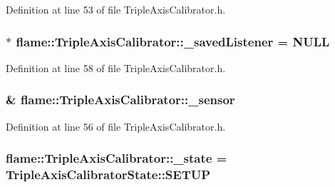 Definition at line 53 of file Triple\-Axis\-Calibrator.\-h.

\hypertarget{classflame_1_1_triple_axis_calibrator_ae80be2c28e5243d39b12c33f24ecb595}{
\subsubsection[{\-\_\-saved\-Listener}]{$\ast$ flame\-::\-Triple\-Axis\-Calibrator\-::\-\_\-saved\-Listener = N\-U\-L\-L\hspace{0.3cm}{\ttfamily [protected]}}}\label{classflame_1_1_triple_axis_calibrator_ae80be2c28e5243d39b12c33f24ecb595}


Definition at line 58 of file Triple\-Axis\-Calibrator.\-h.

\hypertarget{classflame_1_1_triple_axis_calibrator_a4f0dd2bfe0f85a0229fbf74f9944161d}{
\subsubsection[{\-\_\-sensor}]{\& flame\-::\-Triple\-Axis\-Calibrator\-::\-\_\-sensor\hspace{0.3cm}{\ttfamily [protected]}}}\label{classflame_1_1_triple_axis_calibrator_a4f0dd2bfe0f85a0229fbf74f9944161d}


Definition at line 56 of file Triple\-Axis\-Calibrator.\-h.

\hypertarget{classflame_1_1_triple_axis_calibrator_a4853069366d07f826e099879724b9083}{
\subsubsection[{\-\_\-state}]{ flame\-::\-Triple\-Axis\-Calibrator\-::\-\_\-state = {\bf Triple\-Axis\-Calibrator\-State\-::\-S\-E\-T\-U\-P}\hspace{0.3cm}{\ttfamily [protected]}}}\label{classflame_1_1_triple_axis_calibrator_a4853069366d07f826e099879724b9083}


